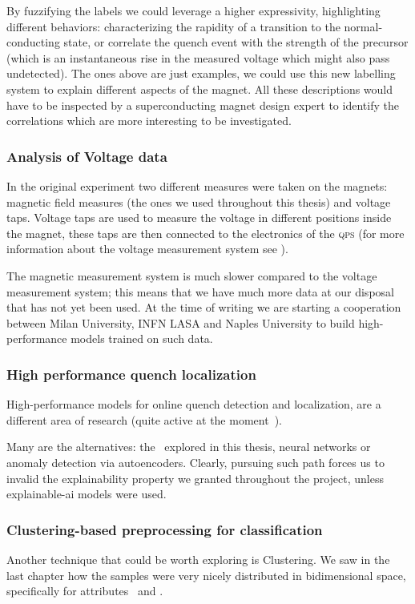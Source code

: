 By fuzzifying the labels we could leverage a higher expressivity, highlighting different
behaviors: characterizing the rapidity of a transition to the normal-conducting state, or correlate
the quench event with the strength of the precursor (which is an instantaneous rise in the measured
voltage which might also pass undetected). The ones above are just examples, we could use this new labelling system to explain
different aspects of the magnet. All these descriptions would have to be inspected by a
superconducting magnet design expert to identify the correlations which are more interesting to be
investigated.

\subsubsection{Analysis of Voltage data}
In the original experiment two different measures were taken on the magnets: magnetic field measures (the
ones we used throughout this thesis) and voltage taps. Voltage taps are used to measure the voltage
in different positions inside the magnet, these taps are then connected to the electronics of the
\textsc{qps} (for more information about the voltage measurement system see ).

The magnetic measurement system is much slower compared to the voltage measurement system; this
means that we have much more data at our disposal that has not yet been used. At the time of writing
we are starting a cooperation between Milan University, INFN LASA and Naples University to build
high-performance models trained on such data.

\subsubsection{High performance quench localization}
High-performance models for online quench detection and localization, are a different area of
research (quite active at the moment~\cite{hoang2021, zhou2021, einstein2023}).

Many are the alternatives: the \svcs\ explored in this thesis, neural networks or anomaly detection
via autoencoders. Clearly, pursuing such path forces us to invalid the explainability property we
granted throughout the project, unless explainable-ai models were used.

\subsubsection{Clustering-based preprocessing for classification}
Another technique that could be worth exploring is Clustering. We saw in the last chapter how the
samples were very nicely distributed in bidimensional space, specifically for attributes \an\ and
\cnmod.


